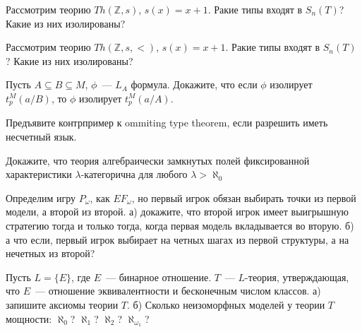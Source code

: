 \setcounter{curtask}{15}


\begin{task}
    Рассмотрим теорию $Th(\mathbb{Z}, s)$, $s(x) = x + 1$. Ракие типы входят в
    $S_n(T)$? Какие из них изолированы?
\end{task}

\begin{task}
    Рассмотрим теорию $Th(\mathbb{Z}, s, <)$, $s(x) = x + 1$. Ракие типы входят в
    $S_n(T)$? Какие из них изолированы?
\end{task}

\begin{task}
    Пусть $A \subseteq B \subseteq M$, $\phi$~--- $L_A$ формула. Докажите, что если
    $\phi$ изолирует $t_p^M(a / B)$, то $\phi$ изолирует $t_p^M(a / A)$.
\end{task}

\begin{task}
    Предъявите контрпример к ommiting type theorem, если разрешить иметь несчетный
    язык.
\end{task}


\breakline



\begin{ptask}{6}
    Докажите, что теория алгебраически замкнутых полей фиксированной характеристики
    $\lambda$-категорична для любого $\lambda > \aleph_0$
\end{ptask}

\begin{ptask}{9}
    Определим игру $P_{\omega}$, как $EF_{\omega}$, но первый игрок обязан выбирать
    точки из первой модели, а второй из второй.
	а) докажите, что второй игрок имеет выигрышную стратегию тогда и только тогда,
    когда первая модель вкладывается во вторую.
    б) а что если, первый игрок выбирает на четных шагах из первой структуры, а на
    нечетных из второй?
\end{ptask}

\begin{ptask}{10}
    Пусть $L = \{E\}$, где $E$~--- бинарное отношение. $T$~--- $L$-теория,
    утверждающая, что $E$~--- отношение эквивалентности и бесконечным числом классов.
    а) запишите аксиомы теории $T$.
    б) Сколько неизоморфных моделей у теории $T$ мощности: $\aleph_0$? $\aleph_1$?
    $\aleph_2$? $\aleph_{\omega_1}$?
\end{ptask}
